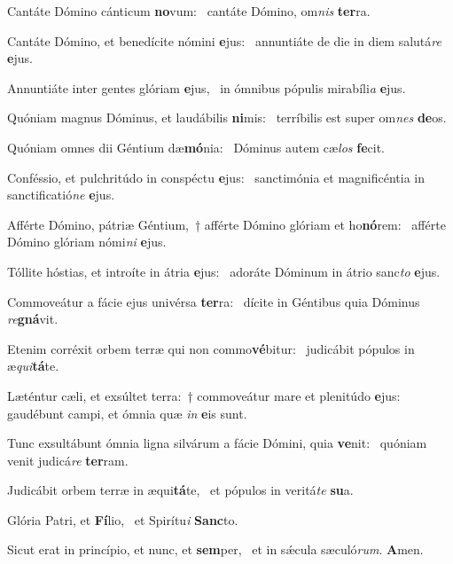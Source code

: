 \item Cantáte Dómino cánticum \textbf{no}vum:~\psstar{} cantáte Dómino, om\textit{nis} \textbf{ter}ra.
\item Cantáte Dómino, et benedícite nómini \textbf{e}jus:~\psstar{} annuntiáte de die in diem salutá\textit{re} \textbf{e}jus.
\item Annuntiáte inter gentes glóriam \textbf{e}jus,~\psstar{} in ómnibus pópulis mirabíli\textit{a} \textbf{e}jus.
\item Quóniam magnus Dóminus, et laudábilis \textbf{ni}mis:~\psstar{} terríbilis est super om\textit{nes} \textbf{de}os.
\item Quóniam omnes dii Géntium dæ\textbf{mó}nia:~\psstar{} Dóminus autem cæ\textit{los} \textbf{fe}cit.
\item Conféssio, et pulchritúdo in conspéctu \textbf{e}jus:~\psstar{} sanctimónia et magnificéntia in sanctificatió\textit{ne} \textbf{e}jus.
\item Afférte Dómino, pátriæ Géntium,~† afférte Dómino glóriam et ho\textbf{nó}rem:~\psstar{} afférte Dómino glóriam nómi\textit{ni} \textbf{e}jus.
\item Tóllite hóstias, et introíte in átria \textbf{e}jus:~\psstar{} adoráte Dóminum in átrio sanc\textit{to} \textbf{e}jus.
\item Commoveátur a fácie ejus univérsa \textbf{ter}ra:~\psstar{} dícite in Géntibus quia Dóminus \textit{re}\textbf{gná}vit.
\item Etenim corréxit orbem terræ qui non commo\textbf{vé}bitur:~\psstar{} judicábit pópulos in æ\textit{qui}\textbf{tá}te.
\item Læténtur cæli, et exsúltet terra:~† commoveátur mare et plenitúdo \textbf{e}jus:~\psstar{} gaudébunt campi, et ómnia quæ \textit{in} \textbf{e}is sunt.
\item Tunc exsultábunt ómnia ligna silvárum a fácie Dómini, quia \textbf{ve}nit:~\psstar{} quóniam venit judicá\textit{re} \textbf{ter}ram.
\item Judicábit orbem terræ in æqui\textbf{tá}te,~\psstar{} et pópulos in veritá\textit{te} \textbf{su}a.
\item Glória Patri, et \textbf{Fí}lio,~\psstar{} et Spirítu\textit{i} \textbf{Sanc}to.
\item Sicut erat in princípio, et nunc, et \textbf{sem}per,~\psstar{} et in sǽcula sæculó\textit{rum}. \textbf{A}men.